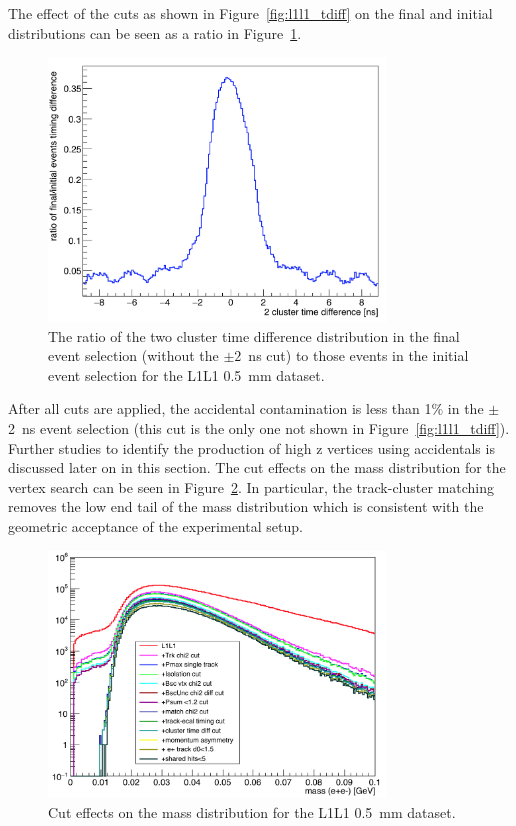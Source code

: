 \documentclass[twoside]{article}
\begin{document}
The effect of the cuts as shown in Figure~\ref{fig:l1l1_tdiff} on the final and initial distributions can be seen as a ratio in Figure~\ref{fig:l1l1_tdiffR}.

\begin{figure}[H]
  \centering
      \includegraphics[width=0.8\textwidth]{plots/ratio_tdiff_cuts.png}
  \caption{The ratio of the two cluster time difference distribution in the final event selection (without the $\pm2$~ns cut) to those events in the initial event selection for the L1L1 0.5~mm dataset.}
  \label{fig:l1l1_tdiffR}
\end{figure}

After all cuts are applied, the accidental contamination is less than 1$\%$ in the $\pm$ 2~ns event selection (this cut is the only one not shown in Figure~\ref{fig:l1l1_tdiff}). Further studies to identify the production of high z vertices using accidentals is discussed later on in this section. The cut effects on the mass distribution for the vertex search can be seen in Figure~\ref{fig:l1l1_mass}. In particular, the track-cluster matching removes the low end tail of the mass distribution which is consistent with the geometric acceptance of the experimental setup.

\begin{figure}[H]
  \centering
      \includegraphics[width=0.8\textwidth]{plots/mass_L1L1_cuts.png}
  \caption{Cut effects on the mass distribution for the L1L1 0.5~mm dataset.}
  \label{fig:l1l1_mass}
\end{figure} 
\end{document}
